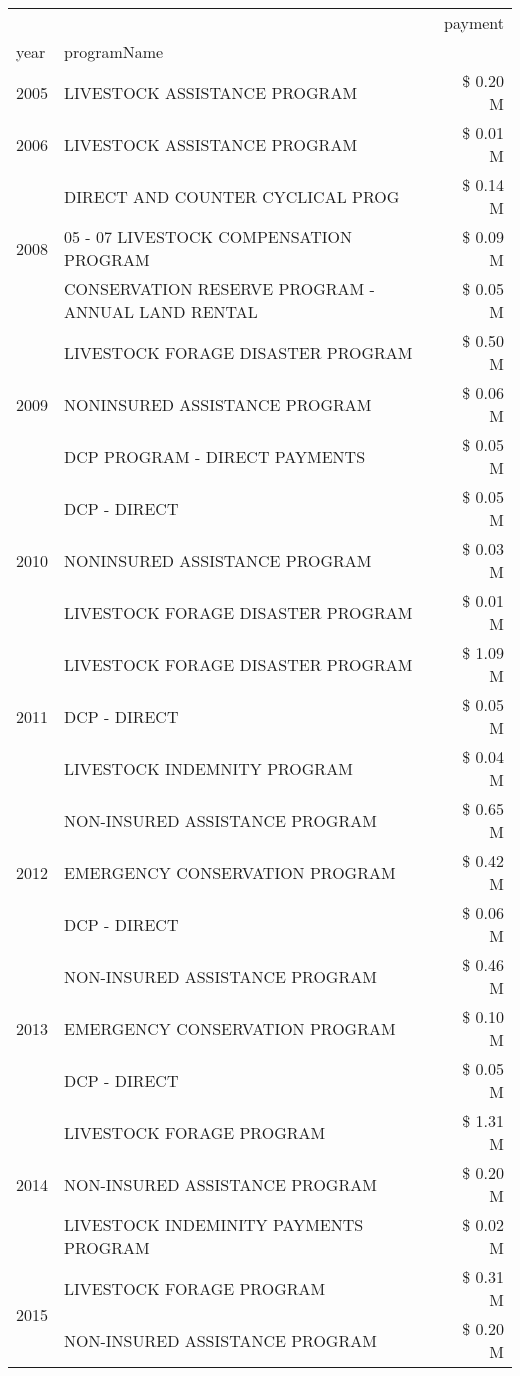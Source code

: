 \begin{tabular}{llr}
\toprule
 &  & payment \\
year & programName &  \\
\midrule
2005 & LIVESTOCK ASSISTANCE PROGRAM & \$ 0.20 M \\
\cline{1-3}
2006 & LIVESTOCK ASSISTANCE PROGRAM & \$ 0.01 M \\
\cline{1-3}
\multirow[t]{3}{*}{2008} & DIRECT AND COUNTER CYCLICAL PROG & \$ 0.14 M \\
 & 05 - 07 LIVESTOCK COMPENSATION PROGRAM & \$ 0.09 M \\
 & CONSERVATION RESERVE PROGRAM - ANNUAL LAND RENTAL & \$ 0.05 M \\
\cline{1-3}
\multirow[t]{3}{*}{2009} & LIVESTOCK FORAGE DISASTER  PROGRAM & \$ 0.50 M \\
 & NONINSURED ASSISTANCE PROGRAM & \$ 0.06 M \\
 & DCP PROGRAM - DIRECT PAYMENTS & \$ 0.05 M \\
\cline{1-3}
\multirow[t]{3}{*}{2010} & DCP - DIRECT & \$ 0.05 M \\
 & NONINSURED ASSISTANCE PROGRAM & \$ 0.03 M \\
 & LIVESTOCK FORAGE DISASTER PROGRAM & \$ 0.01 M \\
\cline{1-3}
\multirow[t]{3}{*}{2011} & LIVESTOCK FORAGE DISASTER PROGRAM & \$ 1.09 M \\
 & DCP - DIRECT & \$ 0.05 M \\
 & LIVESTOCK INDEMNITY PROGRAM & \$ 0.04 M \\
\cline{1-3}
\multirow[t]{3}{*}{2012} & NON-INSURED ASSISTANCE PROGRAM & \$ 0.65 M \\
 & EMERGENCY CONSERVATION PROGRAM & \$ 0.42 M \\
 & DCP - DIRECT & \$ 0.06 M \\
\cline{1-3}
\multirow[t]{3}{*}{2013} & NON-INSURED ASSISTANCE PROGRAM & \$ 0.46 M \\
 & EMERGENCY CONSERVATION PROGRAM & \$ 0.10 M \\
 & DCP - DIRECT & \$ 0.05 M \\
\cline{1-3}
\multirow[t]{3}{*}{2014} & LIVESTOCK FORAGE PROGRAM & \$ 1.31 M \\
 & NON-INSURED ASSISTANCE PROGRAM & \$ 0.20 M \\
 & LIVESTOCK INDEMINITY PAYMENTS PROGRAM & \$ 0.02 M \\
\cline{1-3}
\multirow[t]{3}{*}{2015} & LIVESTOCK FORAGE PROGRAM & \$ 0.31 M \\
 & NON-INSURED ASSISTANCE PROGRAM & \$ 0.20 M \\

\end{tabular}
